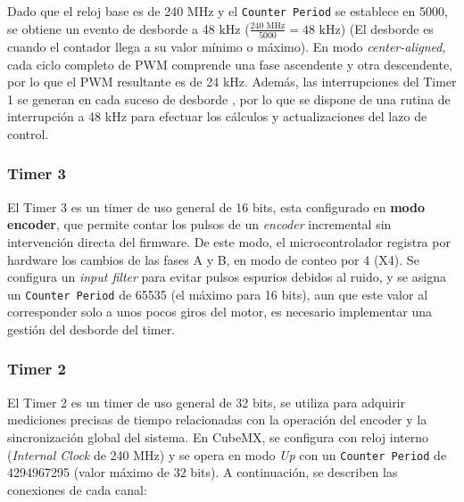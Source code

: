 \documentclass[11pt]{report}
\begin{document}
Dado que el reloj base es de 240 MHz y el \texttt{Counter Period} se establece en 5000, se obtiene un evento de desborde a 48 kHz (\(\frac{240\text{ MHz}}{5000} = 48\text{ kHz}\)) (El desborde es cuando el contador llega a su valor mínimo o máximo). En modo \emph{center-aligned}, cada ciclo completo de PWM comprende una fase ascendente y otra descendente, por lo que el PWM resultante es de 24 kHz. Además, las interrupciones del Timer 1 se generan en cada suceso de desborde , por lo que se dispone de una rutina de interrupción a 48 kHz para efectuar los cálculos y actualizaciones del lazo de control.

\subsubsection{Timer 3}
El Timer 3 es un timer de uso general de 16 bits, esta configurado en \textbf{modo encoder}, que permite contar los pulsos de un \emph{encoder} incremental sin intervención directa del firmware. De este modo, el microcontrolador registra por hardware los cambios de las fases A y B, en modo de conteo por 4 (X4). Se configura un \emph{input filter} para evitar pulsos espurios debidos al ruido, y se asigna un \texttt{Counter Period} de 65535 (el máximo para 16 bits), aun que este valor al corresponder solo a unos pocos giros del motor, es necesario implementar una gestión del desborde del timer.

\subsubsection{Timer 2}
El Timer 2 es un timer de uso general de 32 bits, se utiliza para adquirir mediciones precisas de tiempo relacionadas con la operación del encoder y la sincronización global del sistema. En CubeMX, se configura con reloj interno (\emph{Internal Clock} de 240 MHz) y se opera en modo \emph{Up} con un \texttt{Counter Period} de 4294967295 (valor máximo de 32 bits). A continuación, se describen las conexiones de cada canal:
\end{document}
